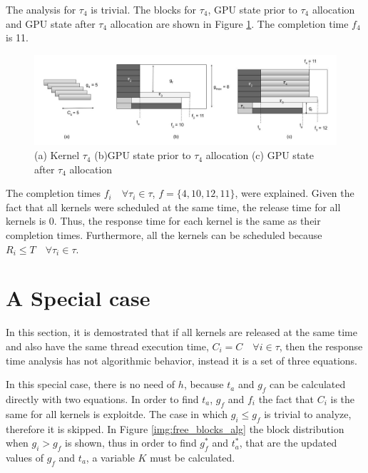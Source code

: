 \documentclass[
  12pt,
  a4paperpaper,
]{report}
\begin{document}
The analysis for \(\tau_4\) is trivial. The blocks for \(\tau_4\), GPU state prior to \(\tau_4\) allocation and GPU state after \(\tau_4\) allocation are shown in Figure \ref{img:ex_4}. 
The completion time \(f_4\) is 11.

\begin{figure}
\centering
\includegraphics{source/figures/ex_4.jpg}
\caption{(a) Kernel \(\tau_4\) (b)GPU state prior to \(\tau_4\)
allocation (c) GPU state after \(\tau_4\) allocation \label{img:ex_4}}
\end{figure}

The completion times \(f_i \quad \forall \tau_i \in \tau\), \(f = \{4,10,12,11\}\), were explained.
Given the fact that all kernels were scheduled at the same time, the release time for
all kernels is 0. Thus, the response time for each kernel is the same as
their completion times. 
Furthermore,  all the kernels can be scheduled because \(R_i \leq T \quad \forall \tau_i \in \tau\).

\hypertarget{a-special-case}{%
\section{A Special case}\label{a-special-case}}

In this section, it is demostrated  that if all kernels are released at the
same time and also have the same thread execution time,
\(C_i = C \quad \forall i \in \tau\), then the response time analysis has not
algorithmic behavior, instead it is a set of three equations.

In this special case, there is no need of \(h\), because \(t_a\) and
\(g_f\) can be calculated directly with two equations.
In order to find \(t_a\), \(g_f\) and \(f_i\) the fact that \(C_i\) is the same for all kernels is exploitde. 
The case in which \(g_i \leq g_f\) is trivial to analyze, therefore it is skipped.
In Figure \ref{img:free_blocks_alg} the block
distribution when \(g_i > g_f\) is shown, thus in order to find \(g^{*}_f\) and
\(t^{*}_a\), that are the updated values of \(g_f\) and \(t_a\), a variable \(K\) must be calculated.
\end{document}
